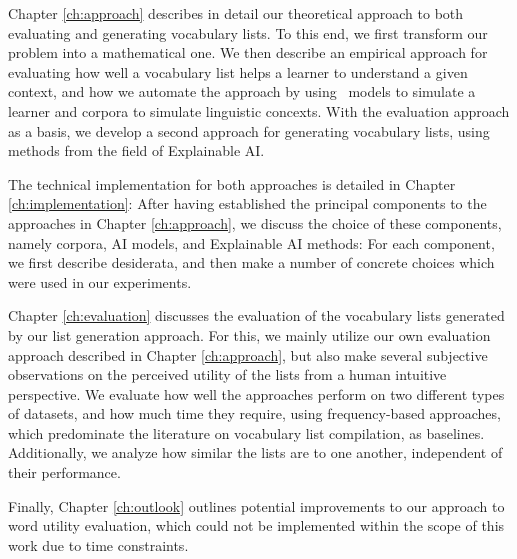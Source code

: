 Chapter \ref{ch:approach} describes in detail our theoretical approach to both evaluating and generating vocabulary lists.
To this end, we first transform our problem into a mathematical one.
We then describe an empirical approach for evaluating how well a vocabulary list helps a learner to understand a given context, and how we automate the approach by using \AI\ models to simulate a learner and corpora to simulate linguistic concexts.
With the evaluation approach as a basis, we develop a second approach for generating vocabulary lists, using methods from the field of Explainable AI.

The technical implementation for both approaches is detailed in Chapter \ref{ch:implementation}:
After having established the principal components to the approaches in Chapter \ref{ch:approach}, we discuss the choice of these components, namely corpora, AI models, and Explainable AI methods:
For each component, we first describe desiderata, and then make a number of concrete choices which were used in our experiments.


Chapter \ref{ch:evaluation} discusses the evaluation of the vocabulary lists generated by our list generation approach.
For this, we mainly utilize our own evaluation approach described in Chapter \ref{ch:approach}, but also make several subjective observations on the perceived utility of the lists from a human intuitive perspective.
We evaluate how well the approaches perform on two different types of datasets, and how much time they require, using frequency-based approaches, which predominate the literature on vocabulary list compilation, as baselines.
Additionally, we analyze how similar the lists are to one another, independent of their performance.

Finally, Chapter \ref{ch:outlook} outlines potential improvements to our approach to word utility evaluation, which could not be implemented within the scope of this work due to time constraints.






